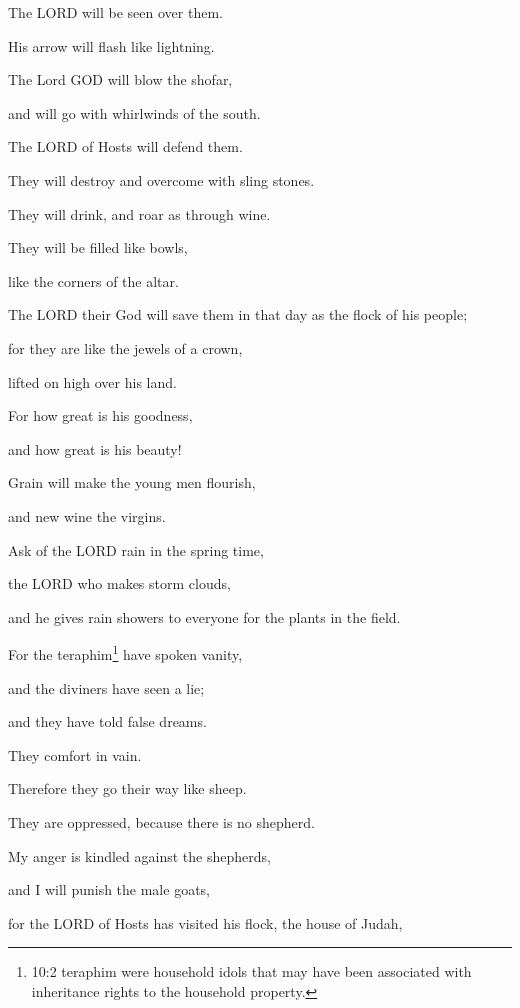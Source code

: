 \vspace{\baselineskip} \myverse{}The LORD will be seen over them.

His arrow will flash like lightning.

The Lord GOD will blow the shofar,

and will go with whirlwinds of the south.

\myverse{}The LORD of Hosts will defend them.

They will destroy and overcome with sling stones.

They will drink, and roar as through wine.

They will be filled like bowls,

like the corners of the altar.


\vspace{\baselineskip} \myverse{}The LORD their God will save them in that day as the flock of
his people;

for they are like the jewels of a crown,

lifted on high over his land.

\myverse{}For how great is his goodness,

and how great is his beauty!

Grain will make the young men flourish,

and new wine the virgins.

\mychapter{} \myverse*{}Ask of the LORD rain in the spring time,

\quad\quad the LORD who makes storm clouds,

and he gives rain showers to everyone for the plants in the field.

\myverse{}For the teraphim\footnote{10:2 teraphim were household idols that may have been associated with inheritance rights to the household
	property.} have spoken vanity,

and the diviners have seen a lie;

and they have told false dreams.

They comfort in vain.

Therefore they go their way like sheep.

They are oppressed, because there is no shepherd.


\vspace{\baselineskip} \myverse{}My anger is kindled against the shepherds,

and I will punish the male goats,

for the LORD of Hosts has visited his flock, the house of Judah,

